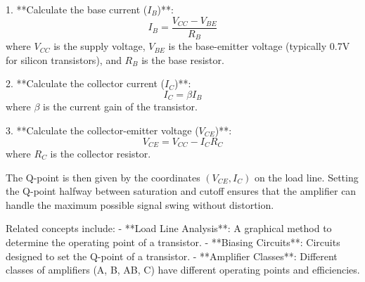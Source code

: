 1. **Calculate the base current (\(I_B\))**:
   \[
   I_B = \frac{V_{CC} - V_{BE}}{R_B}
   \]
   where \(V_{CC}\) is the supply voltage, \(V_{BE}\) is the base-emitter voltage (typically 0.7V for silicon transistors), and \(R_B\) is the base resistor.

2. **Calculate the collector current (\(I_C\))**:
   \[
   I_C = \beta I_B
   \]
   where \(\beta\) is the current gain of the transistor.

3. **Calculate the collector-emitter voltage (\(V_{CE}\))**:
   \[
   V_{CE} = V_{CC} - I_C R_C
   \]
   where \(R_C\) is the collector resistor.

The Q-point is then given by the coordinates \((V_{CE}, I_C)\) on the load line. Setting the Q-point halfway between saturation and cutoff ensures that the amplifier can handle the maximum possible signal swing without distortion.

Related concepts include:
- **Load Line Analysis**: A graphical method to determine the operating point of a transistor.
- **Biasing Circuits**: Circuits designed to set the Q-point of a transistor.
- **Amplifier Classes**: Different classes of amplifiers (A, B, AB, C) have different operating points and efficiencies.

